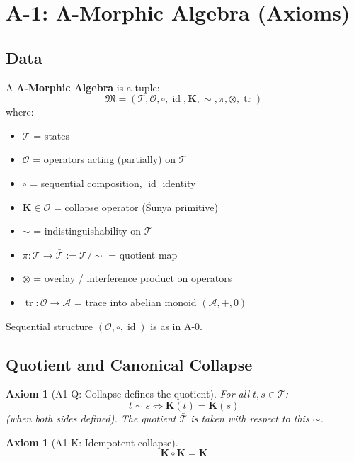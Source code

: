 \documentclass[12pt, oneside]{article}
\newtheorem{axiom}[theorem]{Axiom}
\DeclareMathOperator{\id}{id}
\DeclareMathOperator{\tr}{tr}
\newcommand{\K}{\mathbf{K}}
\newcommand{\A}{\mathcal{A}}
\newcommand{\T}{\mathcal{T}}
\newcommand{\Opr}{\mathcal{O}}
\newcommand{\mf}[1]{\mathfrak{#1}}
\begin{document}
\newpage

\section{A-1: Λ-Morphic Algebra (Axioms)}

\subsection{Data}

A \textbf{Λ-Morphic Algebra} is a tuple:
\begin{equation}
\mf{M} = (\T, \Opr, \circ, \id, \K, \sim, \pi, \otimes, \tr)
\end{equation}
where:
\begin{itemize}
    \item $\T$ = states
    \item $\Opr$ = operators acting (partially) on $\T$
    \item $\circ$ = sequential composition, $\id$ identity
    \item $\K \in \Opr$ = collapse operator (Śūnya primitive)
    \item $\sim$ = indistinguishability on $\T$
    \item $\pi: \T \rightarrow \bar{\T} := \T/{\sim}$ = quotient map
    \item $\otimes$ = overlay / interference product on operators
    \item $\tr: \Opr \rightarrow \A$ = trace into abelian monoid $(\A, +, 0)$
\end{itemize}

Sequential structure $(\Opr, \circ, \id)$ is as in A-0.

\subsection{Quotient and Canonical Collapse}

\begin{axiom}[A1-Q: Collapse defines the quotient]
For all $t, s \in \T$:
\begin{equation}
t \sim s \Longleftrightarrow \K(t) = \K(s)
\end{equation}
(when both sides defined). The quotient $\bar{\T}$ is taken with respect to this $\sim$.
\end{axiom}

\begin{axiom}[A1-K: Idempotent collapse]
\begin{equation}
\K \circ \K = \K
\end{equation}
\end{axiom}
\end{document}
